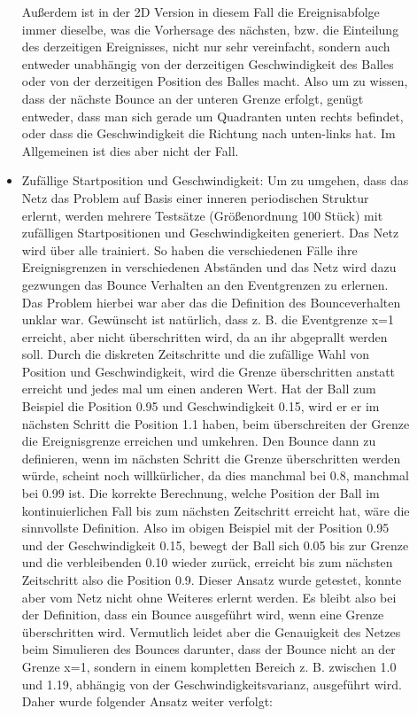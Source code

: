 \begin{description}
\begin{itemize}
		Außerdem ist in der 2D Version in diesem Fall die Ereignisabfolge immer dieselbe, was die Vorhersage des nächsten, bzw. die Einteilung des derzeitigen Ereignisses, nicht nur sehr vereinfacht, sondern auch entweder unabhängig von der derzeitigen Geschwindigkeit des Balles oder von der derzeitigen Position des Balles macht. Also um zu wissen, dass der nächste Bounce an der unteren Grenze erfolgt, genügt entweder, dass man sich gerade um Quadranten unten rechts befindet, oder dass die Geschwindigkeit die Richtung nach unten-links hat. Im Allgemeinen ist dies aber nicht der Fall. 
		\item Zufällige Startposition und Geschwindigkeit: Um zu umgehen, dass das Netz das Problem auf Basis einer inneren periodischen Struktur erlernt, werden mehrere Testsätze (Größenordnung 100 Stück) mit zufälligen Startpositionen und Geschwindigkeiten generiert. Das Netz wird über alle trainiert. So haben die verschiedenen Fälle ihre Ereignisgrenzen in verschiedenen Abständen und das Netz wird dazu gezwungen das Bounce Verhalten an den Eventgrenzen zu erlernen. Das Problem hierbei war aber das die Definition des Bounceverhalten unklar war. Gewünscht ist natürlich, dass z. B. die Eventgrenze x=1 erreicht, aber nicht überschritten wird, da an ihr abgeprallt werden soll. Durch die diskreten Zeitschritte und die zufällige Wahl von Position und Geschwindigkeit, wird die Grenze überschritten anstatt erreicht und jedes mal um einen anderen Wert. Hat der Ball zum Beispiel die Position 0.95 und Geschwindigkeit 0.15, wird er er im nächsten Schritt die Position 1.1 haben, beim überschreiten der Grenze die Ereignisgrenze erreichen und umkehren. Den Bounce dann zu definieren, wenn im nächsten Schritt die Grenze überschritten werden würde, scheint noch willkürlicher, da dies manchmal bei 0.8, manchmal bei 0.99 ist. Die korrekte Berechnung, welche Position der Ball im kontinuierlichen Fall bis zum nächsten Zeitschritt erreicht hat, wäre die sinnvollste Definition. Also im obigen Beispiel mit der Position 0.95 und der Geschwindigkeit 0.15, bewegt der Ball sich 0.05 bis zur Grenze und die verbleibenden 0.10 wieder zurück, erreicht bis zum nächsten Zeitschritt also die Position 0.9. Dieser Ansatz wurde getestet, konnte aber vom Netz nicht ohne Weiteres erlernt werden. Es bleibt also bei der Definition, dass ein Bounce ausgeführt wird, wenn eine Grenze überschritten wird. Vermutlich leidet aber die Genauigkeit des Netzes beim Simulieren des Bounces darunter, dass der Bounce nicht an der Grenze x=1, sondern in einem kompletten Bereich z. B. zwischen 1.0 und 1.19, abhängig von der Geschwindigkeitsvarianz, ausgeführt wird. Daher wurde folgender Ansatz weiter verfolgt:
		

\end{itemize}
\end{description}
